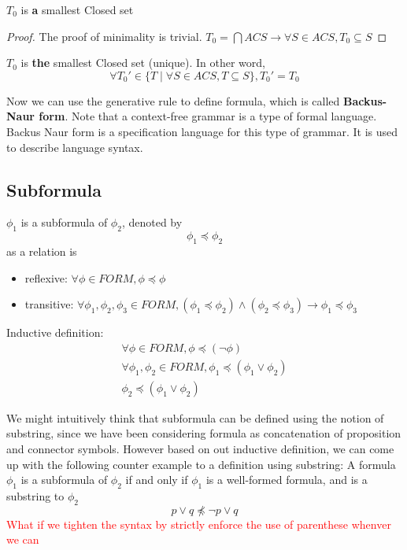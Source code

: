 \documentclass{article}
\newtheorem{definition}[theorem]{Definition}
\let\olddefinition\definition
\let\endolddefinition\enddefinition
\renewenvironment{definition}
  {\begin{tcolorbox}[
      colback=red!10,
      colframe=red!50!black,
      boxrule=0.6pt,
      arc=2pt,
      left=6pt,right=6pt,top=4pt,bottom=4pt,
      breakable
    ]\olddefinition}
  {\endolddefinition\end{tcolorbox}}
\newtheorem{lemma}[theorem]{Lemma}
\let\oldlemma\lemma
\let\endoldlemma\endlemma
\renewenvironment{lemma}
  {\begin{tcolorbox}[
      colback=green!8,
      colframe=green!50!black,
      boxrule=0.6pt,
      arc=2pt,
      left=6pt,right=6pt,top=4pt,bottom=4pt
    ]\oldlemma}
  {\endoldlemma\end{tcolorbox}}
\begin{document}
\begin{lemma}
    $T_0$ is \textbf{a} smallest Closed set
\end{lemma}
\begin{proof}
    The proof of minimality is trivial. $T_0 = \bigcap ACS \rightarrow \forall S \in ACS, T_0 \subseteq S$
\end{proof}
\begin{lemma}
    $T_0$ is \textbf{the} smallest Closed set (unique). In other word, 
    \[\forall T_0' \in \{T \mid \forall S \in ACS, T \subseteq S\}, T_0' = T_0\]
\end{lemma}
Now we can use the generative rule to define formula, which is called \textbf{Backus-Naur form}. Note that a context-free grammar is a type of formal language. 
Backus Naur form is a specification language for this type of grammar. It is used to describe language syntax.
\subsection{Subformula}
\begin{definition}
$\phi_1$ is a subformula of $\phi_2$, denoted by 
\[\phi_1 \preccurlyeq \phi_2\]
as a relation is 
\begin{itemize}
    \item reflexive: $\forall \phi \in FORM, \phi \preccurlyeq \phi$
    \item transitive: $\forall \phi_1, \phi_2, \phi_3 \in FORM, (\phi_1 \preccurlyeq \phi_2) \land (\phi_2 \preccurlyeq \phi_3) \rightarrow \phi_1 \preccurlyeq \phi_3$
\end{itemize}  
Inductive definition:
\begin{align*}
    \forall \phi \in FORM, \phi \preccurlyeq (\neg \phi)\\
    \forall \phi_1, \phi_2 \in FORM, \phi_1 \preccurlyeq (\phi_1 \lor \phi_2)\\
    \phi_2 \preccurlyeq (\phi_1 \lor \phi_2)
\end{align*}
\end{definition}
We might intuitively think that subformula can be defined using the notion of substring, since we have been considering formula as concatenation of 
proposition and connector symbols. However based on out inductive definition, we can come up with the following counter example to a definition using substring: 
A formula $\phi_1$ is a subformula of $\phi_2$ if and only if $\phi_1$ is a well-formed formula, and is a substring to $\phi_2$
\[p \lor q \not\preccurlyeq \neg p \lor q\]
\textcolor{red}{What if we tighten the syntax by strictly enforce the use of parenthese whenver we can}
\end{document}
